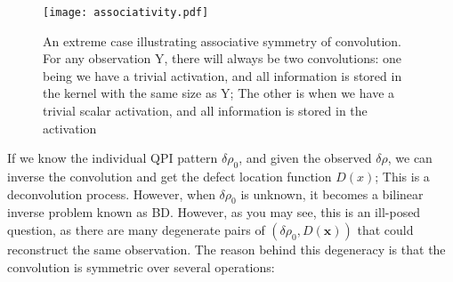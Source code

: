 \begin{figure}
	\texttt{[image: associativity.pdf]} 
	\centering
	\caption{An extreme case illustrating associative symmetry of convolution. For any observation Y, there will always be two convolutions: one being we have a trivial activation, and all information is stored in the kernel with the same size as Y; The other is when we have a trivial scalar activation, and all information is stored in the activation}
	\label{fig:ch6_assoc}
\end{figure}

\noindent If we know the individual QPI pattern $\delta\rho_0$, and given the observed $\delta\rho$, we can inverse the convolution and get the defect location function $D(x)$; This is a deconvolution process. However, when $\delta\rho_0$ is unknown, it becomes a bilinear inverse problem known as \ac{BD}. However, as you may see, this is an ill-posed question, as there are many degenerate pairs of $(\delta\rho_0, D(\mathbf{x}))$ that could reconstruct the same observation. The reason behind this degeneracy is that the convolution is symmetric over several operations: 
